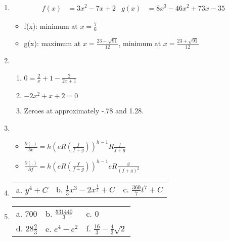 \documentclass[11pt]{article}
\begin{document}
\begin{enumerate}
\item 
\begin{align*}
f(x) &= 3x^2 - 7x + 2 &  g(x) &= 8x^3 - 46x^2 + 73x - 35
\end{align*}
\begin{itemize}
\item f(x): minimum at $x=\frac{7}{6}$
\item g(x): maximum at $x=\frac{23-\sqrt{91}}{12}$, minimum at $x=\frac{23+\sqrt{91}}{12}$
\end{itemize}

\vspace{.5cm}

\item 
\begin{enumerate}
\item $0 = \frac{2}{x} + 1 - \frac{2}{2x+1}$
\item $-2x^2 + x + 2 = 0$
\item Zeroes at approximately -.78 and 1.28.
\end{enumerate}


\vspace{.5cm}

\item 
\begin{itemize}
\item $\frac{\partial(.)}{\partial e} = h(eR(\frac{f}{f+g}))^{h-1}R\frac{f}{f+g} $
\item $\frac{\partial(.)}{\partial f} =h(eR(\frac{f}{f+g}))^{h-1}eR\frac{g}{(f+g)^2} $
\end{itemize} 

\vspace{.5cm}


\item 
\begin{center}
\begin{tabular}{p{4cm}p{4cm}p{4cm}}
a. $y^4 + C$            &  b. $\frac{1}{3}x^3 - 2x^\frac{1}{2} + C$     & c.  $\frac{360}{7}t^7 + C$         \rule{0cm}{1cm}\\
\end{tabular}
\end{center}

\vspace{.5cm}

\item 
\begin{center}
\begin{tabular}{p{4cm}p{4cm}p{4cm}}
a. $700$            &  b. $\frac{531440}{3}$       & c. $0$                        \rule{0cm}{1cm}\\
d. $28\frac{2}{3}$  &  e. $e^4 - e^2$              & f. $\frac{16}{3} - \frac{4}{3}\sqrt{2}$  \rule{0cm}{1cm}\\
\end{tabular}
\end{center}


\end{enumerate}
\end{document}
